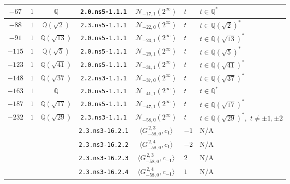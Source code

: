 \documentclass[11pt]{amsart}
\theoremstyle{definition}
\newcommand{\Q}{\mathbb Q}
\newcommand{\QQ}{\mathbb Q}
\begin{document}
{\begin{longtable}{|c|c|c|c|c|l|l|}
        $-67$ & $1$ & $\QQ$& \texttt{2.0.ns5-1.1.1} & $\mathcal N_{-17, 1}(2^{\infty})$ & $t$ & $t\in \Q^*$ \\ \hline


$-88$ & $1$ & $\QQ(\sqrt{2})$& \texttt{2.3.ns5-1.1.1} & $\mathcal N_{-22, 0}(2^{\infty})$ & $t$ & $t\in \Q(\sqrt{2})^*$ \\ \hline

$-91$ & $1$ &$\QQ(\sqrt{13})$ &  \texttt{2.0.ns5-1.1.1} & $\mathcal N_{-23, 1}(2^{\infty})$ & $t$ & $t\in \Q(\sqrt{13})^*$ \\ \hline



$-115$ & $1$ & $\QQ(\sqrt{5})$ & \texttt{2.0.ns5-1.1.1} & $\mathcal N_{-29, 1}(2^{\infty})$ & $t$ & $t\in \Q(\sqrt{5})^*$ \\ \hline



$-123$ & $1$& $\QQ(\sqrt{41})$ & \texttt{2.0.ns5-1.1.1} & $\mathcal N_{-31, 1}(2^{\infty})$ & $t$ & $t\in \Q(\sqrt{41})^*$ \\ \hline

$-148$ & $1$ & $\QQ(\sqrt{37})$ & \texttt{2.2.ns3-1.1.1} & $\mathcal N_{-37, 0}(2^{\infty})$ & $t$ & $t\in \Q(\sqrt{37})^*$ \\ \hline


         $-163$ & $1$ & $\QQ$& \texttt{2.0.ns5-1.1.1} & $\mathcal N_{-41, 1}(2^{\infty})$ & $t$ & $t\in \Q^*$ \\ \hline

$-187$ & $1$& $\QQ(\sqrt{17})$ &  \texttt{2.0.ns5-1.1.1} & $\mathcal N_{-47, 1}(2^{\infty})$ & $t$ & $t\in \Q(\sqrt{17})^*$ \\ \hline


{$-232$}   & {$1$}& {$\QQ(\sqrt{29})$} & \texttt{2.3.ns3-1.1.1} & $\mathcal N_{-58,0}(2^{\infty})$ &   $t$  &  $t\in \Q(\sqrt{29})^*,\,\, t\ne \pm 1,\pm 2$ \\  \cline{4-7} 
 & & & \texttt{2.3.ns3-16.2.1} & $\langle G^{\, 2,3}_{-58,0},c_{1}\rangle$ &   $-1$  &  N/A\\ \cline{4-7}   
 & & & \texttt{2.3.ns3-16.2.2} & $\langle G^{\, 2,4}_{-58,0},c_{1}\rangle$ &   $-2$ &   N/A \\ \cline{4-7}   
 & & & \texttt{2.3.ns3-16.2.3} & $\langle G^{\, 2,3}_{-58,0},c_{-1}\rangle$ &  $2$  & N/A \\ \cline{4-7}   
 & & & \texttt{2.3.ns3-16.2.4} & $\langle G^{\, 2,4}_{-58,0},c_{-1}\rangle$ &   $1$  &  N/A \\ \hline 



\end{longtable}}
\end{document}
